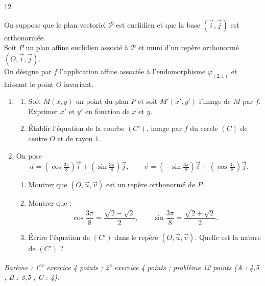 \documentclass{axiobac}
\begin{document}
\begin{probleme}{12}
\horsprogramme

On suppose que le plan vectoriel $\mathcal{P}$ est euclidien et que la base $(\vec{i}, \vec{j})$ est orthonormée. \\
Soit $P$ un plan affine euclidien associé à $\mathcal{P}$ et muni d'un repère orthonormé $(O, \vec{i}, \vec{j})$. \\
On désigne par $f$ l'application affine associée à l'endomorphisme $\varphi_{(2,1)}$ et laissant le point $O$ invariant.

\begin{enumerate}
    \item
    \begin{enumerate}
        \item Soit $M(x, y)$ un point du plan $P$ et soit $M'(x', y')$ l'image de $M$ par $f$. Exprimer $x'$ et $y'$ en fonction de $x$ et $y$.
        \item Établir l'équation de la courbe $(C')$, image par $f$ du cercle $(C)$ de centre $O$ et de rayon $1$.
    \end{enumerate}
    \item On pose
    \[
    \vec{u} = \left(\cos \tfrac{3\pi}{8}\right) \vec{i} + \left(\sin \tfrac{3\pi}{8}\right) \vec{j},
    \qquad
    \vec{v} = \left(-\sin \tfrac{3\pi}{8}\right) \vec{i} + \left(\cos \tfrac{3\pi}{8}\right) \vec{j} .
    \]
    \begin{enumerate}
        \item Montrer que $(O, \vec{u}, \vec{v})$ est un repère orthonormé de $P$.
        \item Montrer que :
        \[
        \cos \frac{3\pi}{8} = \frac{\sqrt{2 - \sqrt{2}}}{2}, \qquad \sin \frac{3\pi}{8} = \frac{\sqrt{2 + \sqrt{2}}}{2} .
        \]
        \item Écrire l'équation de $(C')$ dans le repère $(O, \vec{u}, \vec{v})$. Quelle est la nature de $(C')$ ?
    \end{enumerate}
\end{enumerate}

\end{probleme}

\vspace{1em}
\noindent\textit{Barème : 1\textsuperscript{er} exercice 4 points ; 2\textsuperscript{e} exercice 4 points ; problème 12 points (A : 4,5 ; B : 3,5 ; C : 4).}
\end{document}
